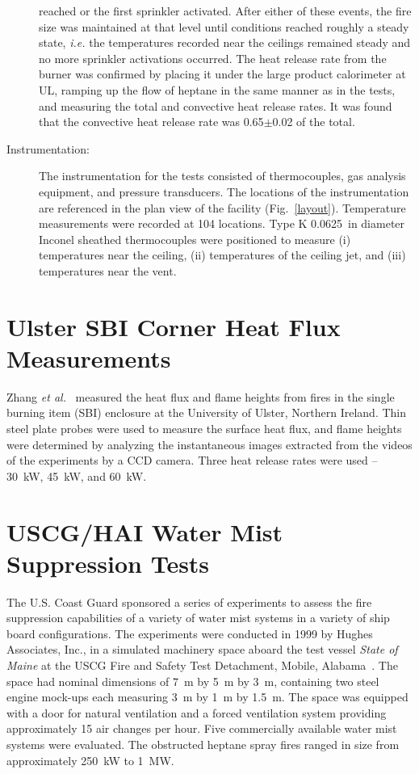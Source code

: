 \begin{description}
reached or the first sprinkler activated. After either of these events, the fire size was maintained at that level until conditions reached roughly a
steady state, {\em i.e.} the temperatures recorded near the ceilings remained steady and no more sprinkler activations occurred.
The heat release rate from the burner was confirmed by placing it under the large product calorimeter at UL, ramping up the flow of heptane in the
same manner as in the tests, and measuring the total and convective heat release rates. It was found that the convective heat release rate was
0.65$\pm$0.02 of the total.
\item[Instrumentation:] The instrumentation for the tests consisted of thermocouples, gas analysis equipment, and pressure transducers. The locations of the instrumentation
are referenced in the plan view of the facility (Fig.~\ref{layout}).
Temperature measurements were recorded at 104 locations. Type K 0.0625~in diameter Inconel sheathed thermocouples were positioned to measure (i)
temperatures near the ceiling, (ii) temperatures of the ceiling jet, and (iii) temperatures near the vent.
\end{description}


\clearpage


\section{Ulster SBI Corner Heat Flux Measurements}

Zhang {\em et al.}~\cite{Zhang:IAFSS9} measured the heat flux and flame heights from
fires in the single burning item (SBI) enclosure at the University of Ulster, Northern Ireland.
Thin steel plate probes were used to measure the surface heat flux, and flame
heights were determined by analyzing the instantaneous images extracted from the videos of the
experiments by a CCD camera. Three heat release rates were used -- 30~kW, 45~kW, and 60~kW.



\section{USCG/HAI Water Mist Suppression Tests}

The U.S. Coast Guard sponsored a series of experiments to assess the fire suppression capabilities of a variety of water mist systems in a variety of ship board configurations. The
experiments were conducted in 1999 by Hughes Associates, Inc., in a simulated machinery space aboard the test vessel {\em State of Maine} at the USCG Fire and Safety Test Detachment,
Mobile, Alabama~\cite{Back:USCG1999}.
The space had nominal dimensions of 7~m by 5~m by 3~m, containing two steel engine mock-ups each measuring 3~m by 1~m by 1.5~m. The space was equipped with a door
for natural ventilation and a forced ventilation system providing approximately 15 air changes per hour. Five commercially available water mist systems were evaluated. The
obstructed heptane spray fires ranged in size from approximately 250~kW to 1~MW.



